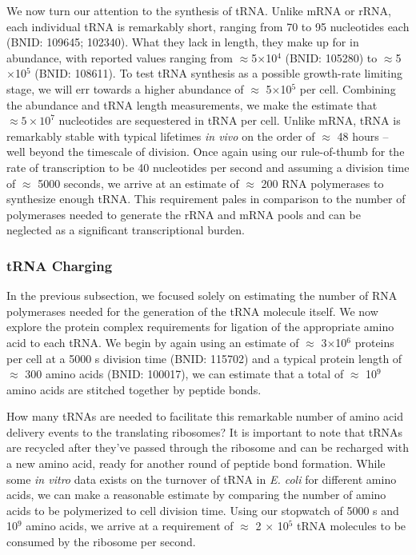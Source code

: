 We now turn our attention to the synthesis of tRNA. Unlike mRNA or rRNA, each
individual tRNA is remarkably short, ranging from 70 to 95 nucleotides each
(BNID: 109645; 102340). What they lack in length, they make up for in
abundance, with reported values ranging from $\approx$5$\times$10$^4$ (BNID:
105280) to $\approx$5$\times$10$^5$ (BNID: 108611). To test tRNA synthesis as
a possible growth-rate limiting stage, we will err towards a higher abundance
of $\approx$ 5$\times$10$^5$ per cell. Combining the abundance and tRNA
length measurements, we make the estimate that $\approx 5 \times 10^7$
nucleotides are sequestered in tRNA per cell. Unlike mRNA, tRNA is remarkably
stable with typical lifetimes \textit{in vivo} on the order of $\approx$ 48
hours \citep{abelson1974,svenningsen2017} -- well beyond the timescale of
division. Once again using our rule-of-thumb for the rate of transcription to
be 40 nucleotides per second and assuming a division time of $\approx$ 5000
seconds, we arrive at an estimate of $\approx$ 200 RNA polymerases to
synthesize enough tRNA. This requirement pales in comparison to the number of
polymerases needed to generate the rRNA and mRNA pools and can be neglected
as a significant transcriptional burden.

\subsubsection{tRNA Charging}
In the previous subsection, we focused solely on estimating the number of RNA
polymerases needed for the generation of the tRNA molecule itself. We now
explore the protein complex requirements for ligation of the appropriate
amino acid to each tRNA. We begin by again using an estimate of $\approx$
3$\times$10$^6$ proteins per cell at a 5000 s division time (BNID: 115702)
and a typical protein length of $\approx$ 300 amino acids (BNID: 100017), we
can estimate that a total of $\approx$ 10$^9$ amino acids are stitched
together by peptide bonds.

How many tRNAs are needed to facilitate this remarkable number of amino acid
delivery events to the translating ribosomes? It is important to note that
tRNAs are recycled after they've passed through the ribosome and can be
recharged with a new amino acid, ready for another round of peptide bond
formation. While some \textit{in vitro} data exists on the turnover of tRNA
in \textit{E. coli} for different amino acids, we can make a reasonable
estimate by comparing the number of amino acids to be polymerized to cell
division time. Using our stopwatch of 5000 s and 10$^9$ amino acids, we
arrive at a requirement of $\approx$ 2 $\times$ 10$^5$ tRNA molecules to be
consumed by the ribosome per second.

